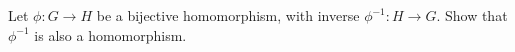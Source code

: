 \begin{problem}
  Let $\phi \colon G \to H$ be a bijective homomorphism, with inverse $\phi^{-1}
  \colon H \to G$.  Show that $\phi^{-1}$ is also a homomorphism.
\end{problem}
\begin{Answer}

\end{Answer}
